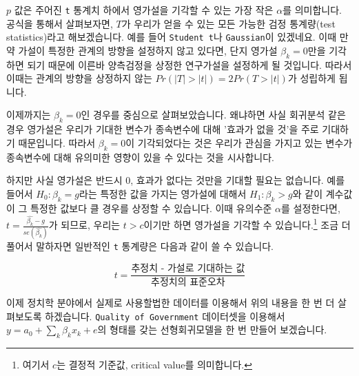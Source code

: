 \documentclass[
]{book}
\begin{document}
\(p\) 값은 주어진 \texttt{t} 통계치 하에서 영가설을 기각할 수 있는 가장 작은 \(\alpha\)를 의미합니다. 공식을 통해서 살펴보자면, \(T\)가 우리가 얻을 수 있는 모든 가능한 검정 통계량(test statistics)라고 해보겠습니다. 예를 들어 \texttt{Student\ t}나 \texttt{Gaussian}이 있겠네요. 이때 만약 가설이 특정한 관계의 방향을 설정하지 않고 있다면, 단지 영가설 \(\beta_k = 0\)만을 기각하면 되기 때문에 이른바 양측검정을 상정한 연구가설을 설정하게 될 것입니다. 따라서 이때는 관계의 방향을 상정하지 않는 \(Pr(|T|>|t|) = 2Pr(T>|t|)\)가 성립하게 됩니다.

이제까지는 \(\beta_k = 0\)인 경우를 중심으로 살펴보았습니다. 왜냐하면 사실 회귀분석 같은 경우 영가설은 우리가 기대한 변수가 종속변수에 대해 '효과가 없을 것'을 주로 기대하기 때문입니다. 따라서 \(\beta_k = 0\)이 기각되었다는 것은 우리가 관심을 가지고 있는 변수가 종속변수에 대해 유의미한 영향이 있을 수 있다는 것을 시사합니다.

하지만 사실 영가설은 반드시 0, 효과가 없다는 것만을 기대할 필요는 없습니다. 예를 들어서 \(H_0: \beta_k = g\)라는 특정한 값을 가지는 영가설에 대해서 \(H_1: \beta_k > g\)와 같이 계수값이 그 특정한 값보다 클 경우를 상정할 수 있습니다. 이때 유의수준 \(\alpha\)를 설정한다면, \(t = \frac{\hat{\beta_k} - g}{se(\hat{\beta_k})}\)가 되므로, 우리는 \(t > c\)이기만 하면 영가설을 기각할 수 있습니다.\footnote{여기서 \(c\)는 결정적 기준값, critical value를 의미합니다.} 조금 더 풀어서 말하자면 일반적인 \texttt{t} 통계량은 다음과 같이 쓸 수 있습니다.

\[
t = \frac{\text{추정치 - 가설로 기대하는 값}}{\text{추정치의 표준오차}}
\]

이제 정치학 분야에서 실제로 사용할법한 데이터를 이용해서 위의 내용을 한 번 더 살펴보도록 하겠습니다. \texttt{Quality\ of\ Government} 데이터셋을 이용해서 \(y = a_0 + \sum_k \beta_k x_k + e\)의 형태를 갖는 선형회귀모델을 한 번 만들어 보겠습니다.
\end{document}
